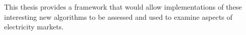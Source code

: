 This thesis provides a framework that would allow implementations of these
interesting new algorithms to be assessed and used to examine aspects of
electricity markets.

%
%
%
%
